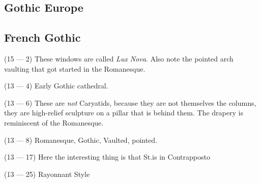 \documentclass{article}
\begin{document}
    \begin{spacing}{1.2}
    \newpage
        \section{Gothic Europe}
        \subsection{French Gothic}
        (15 --- 2) These windows are called \emph{Lux Nova}. Also note the pointed arch vaulting that got started in the Romanesque.

        (13 --- 4) Early Gothic cathedral. 

        (13 --- 6) These are \emph{not} Caryatids, because they are not themselves the columns, they are high-relief sculpture on a pillar that is behind them. The drapery is reminiscent of the Romanesque.

        (13 --- 8) Romanesque, Gothic, Vaulted, pointed.

        (13 --- 17) Here the interesting thing is that St.\@Thomas is in Contrapposto

        (13 --- 25) Rayonnant Style
    \end{spacing}
\end{document}
